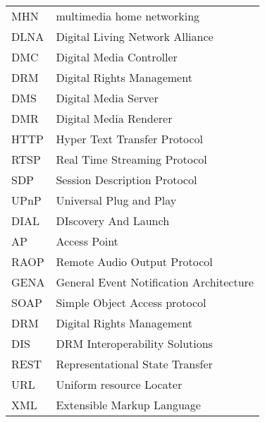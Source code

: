 



\begin{tabular}{ll}
MHN	   & multimedia home networking \\
DLNA       & Digital Living Network Alliance\label{dlna_shortfor} \\ 
DMC        & Digital Media Controller \\
DRM        & Digital Rights Management \\ 
DMS        & Digital Media Server \\
DMR        & Digital Media Renderer \\
HTTP       & Hyper Text Transfer Protocol \\
RTSP       & Real Time Streaming Protocol \\
SDP    	& Session Description Protocol\\ 
UPnP	   & Universal Plug and Play \label{upnp_shortfor} \\
DIAL	   & DIscovery And Launch \label{dial_shortfor} \\
AP	   & Access Point \\
RAOP	   & Remote Audio Output Protocol\\
GENA		& General Event Notification Architecture\\
SOAP		& Simple Object Access protocol\\
DRM		& Digital Rights Management\\
DIS		& DRM Interoperability Solutions\\
REST		& Representational State Transfer\\
URL		& Uniform resource Locater \\
XML		& Extensible Markup Language \\
\end{tabular}
